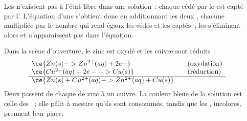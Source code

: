 \begin{proposition}\label{prop:g11:redox:no-free-electrons}
Les  n'existent pas à l'état libre dans une solution~: chaque
 cédé par le  est capté par l'. L'équation d'une
 s'obtient donc en additionnant les deux
, chacune multipliée par le nombre qui rend égaux les
 cédés et les  captés~; les  s'éliminent
alors et n'apparaissent pas dans l'équation.
\end{proposition}

\begin{example}\label{ex:g11:redox:zinc-copper}
Dans la scène d'ouverture, le zinc est oxydé et les  cuivre sont
réduits~:
\[
\begin{array}{l@{\qquad}l}
  \ce{Zn(s) -> Zn^{2+}(aq) + 2e-} & \text{(oxydation)}\\
  \ce{Cu^{2+}(aq) + 2e- -> Cu(s)} & \text{(réduction)}\\
  \hline
  \ce{Zn(s) + Cu^{2+}(aq) -> Zn^{2+}(aq) + Cu(s)} &
\end{array}
\]
Deux  passent de chaque  de zinc à un  cuivre. La
couleur bleue de la solution est celle des  ~; elle
pâlit à mesure qu'ils sont consommés, tandis que les  ,
incolores, prennent leur place.
\end{example}

